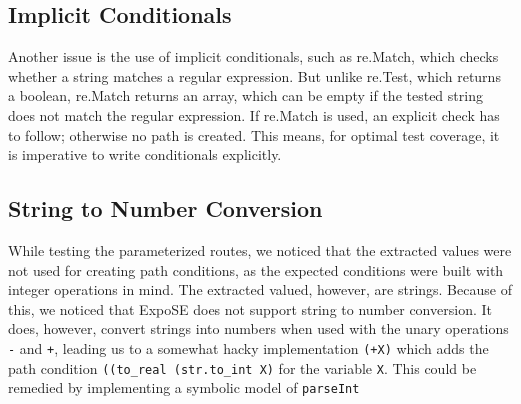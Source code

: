 \subsection{Implicit Conditionals}
Another issue is the use of implicit conditionals, such as re.Match, which checks whether a string matches a regular expression. But unlike re.Test, which returns a boolean, re.Match returns an array, which can be empty if the tested string does not match the regular expression. 
If re.Match is used, an explicit check has to follow; otherwise no path is created. 
This means, for optimal test coverage, it is imperative to write conditionals explicitly. 

\subsection{String to Number Conversion}
While testing the parameterized routes, we noticed that the extracted values were not used for creating path conditions, as the expected conditions were built with integer operations in mind. The extracted valued, however, are strings. Because of this, we noticed that ExpoSE does not support string to number conversion. It does, however, convert strings into numbers when used with the unary operations \lstinline{-} and \lstinline{+}, leading us to a somewhat hacky implementation \lstinline{(+X)} which adds the path condition \lstinline{((to_real (str.to_int X)} for the variable \lstinline{X}. This could be remedied by implementing a symbolic model of \lstinline{parseInt}








